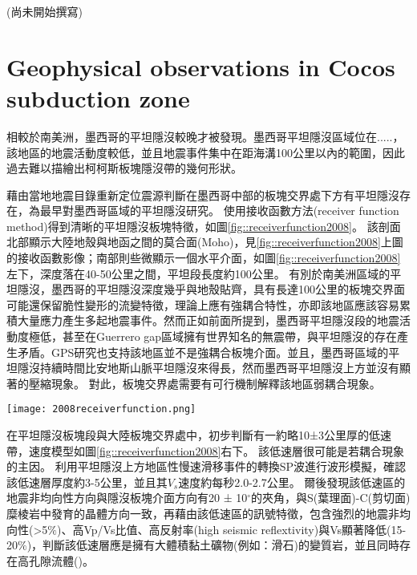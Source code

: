 (尚未開始撰寫)

\section{Geophysical observations in Cocos subduction zone}
相較於南美洲，墨西哥的平坦隱沒較晚才被發現。墨西哥平坦隱沒區域位在.....，該地區的地震活動度較低，並且地震事件集中在距海溝100公里以內的範圍，因此過去難以描繪出柯柯斯板塊隱沒帶的幾何形狀。

\citealp{pardo1995}藉由當地地震目錄重新定位震源判斷在墨西哥中部的板塊交界處下方有平坦隱沒存在，為最早對墨西哥區域的平坦隱沒研究。
\citealp{PerezCampos2008}使用接收函數方法(receiver function method)得到清晰的平坦隱沒板塊特徵，如圖\ref{fig::receiverfunction2008}。
該剖面北部顯示大陸地殼與地函之間的莫合面(Moho)，見\ref{fig::receiverfunction2008}上圖的接收函數影像；南部則些微顯示一個水平介面，如圖\ref{fig::receiverfunction2008}左下，深度落在40-50公里之間，平坦段長度約100公里。
有別於南美洲區域的平坦隱沒，墨西哥的平坦隱沒深度幾乎與地殼貼齊，具有長達100公里的板塊交界面可能還保留脆性變形的流變特徵，理論上應有強耦合特性，亦即該地區應該容易累積大量應力產生多起地震事件。然而正如前面所提到，墨西哥平坦隱沒段的地震活動度極低，甚至在Guerrero gap區域擁有世界知名的無震帶，與平坦隱沒的存在產生矛盾。GPS研究也支持該地區並不是強耦合板塊介面。並且，墨西哥區域的平坦隱沒持續時間比安地斯山脈平坦隱沒來得長，然而墨西哥平坦隱沒上方並沒有顯著的壓縮現象。
對此，板塊交界處需要有可行機制解釋該地區弱耦合現象。

\begin{figure*}[ht!]
    \centering
    \texttt{[image: 2008receiverfunction.png]}
    \caption{墨西哥平坦隱沒區域接收函數結果，摘自\citealp{PerezCampos2008}。上圖：黑色三角形表示測站沿剖面的位置，高程被放大10倍。粗棕色線表示跨墨西哥火山帶(TMVB, Trans-Mexican Volcanic Belt)的範圍。上圖接收函數影像中標出沿剖面50公里範圍內的震源(粉紅色點來自SSN地震目錄；綠色點來自\citealp{pardo1995}重新定位結果)位置。下方左圖：顯示沿平坦隱沒板塊的一次遠震事件的接收函數。下方中間圖:說明了相應的模型（LVM(low velocity mantle) = 低速地函和 OC(oceanic crust) = 海洋地殼）。下方右圖：根據左下圖接收函數模型中A、B和C位置上的P波速度模型。
    }
    \label{fig::receiverfunction2008}
\end{figure*}

\citealp{PerezCampos2008}在平坦隱沒板塊段與大陸板塊交界處中，初步判斷有一約略10±3公里厚的低速帶，速度模型如圖\ref{fig::receiverfunction2008}右下。
該低速層很可能是若耦合現象的主因。
\citealp{Song2009}利用平坦隱沒上方地區性慢速滑移事件的轉換SP波進行波形模擬，確認該低速層厚度約3-5公里，並且其$V_s$速度約每秒2.0-2.7公里。
爾後\citealp{Song2012SC}發現該低速區的地震非均向性方向與隱沒板塊介面方向有20 ± 10$^{\circ}$的夾角，與S(葉理面)-C(剪切面)糜棱岩中發育的晶體方向一致，再藉由該低速區的訊號特徵，包含強烈的地震非均向性(>5$\%$)、高Vp/Vs比值、高反射率(high seismic reflextivity)與Vs顯著降低(15-20$\%$)，判斷該低速層應是擁有大體積黏土礦物(例如：滑石)的變質岩，並且同時存在高孔隙流體(\citealp{Kim2012})。


